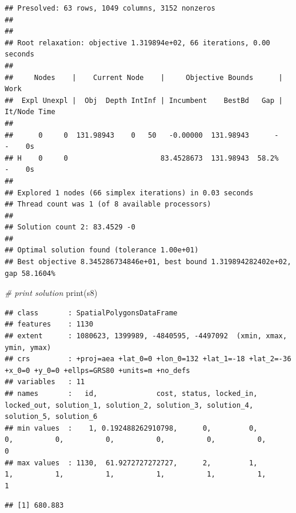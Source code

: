 \documentclass[
  12pt,
]{book}
\newenvironment{Shaded}{\begin{snugshade}}{\end{snugshade}}
\newcommand{\CommentTok}[1]{\textcolor[rgb]{0.56,0.35,0.01}{\textit{#1}}}
\newcommand{\FunctionTok}[1]{\textcolor[rgb]{0.00,0.00,0.00}{#1}}
\newcommand{\NormalTok}[1]{#1}
\newcommand{\SpecialCharTok}[1]{\textcolor[rgb]{0.00,0.00,0.00}{#1}}
\begin{document}
\begin{verbatim}
## Presolved: 63 rows, 1049 columns, 3152 nonzeros
## 
## 
## Root relaxation: objective 1.319894e+02, 66 iterations, 0.00 seconds
## 
##     Nodes    |    Current Node    |     Objective Bounds      |     Work
##  Expl Unexpl |  Obj  Depth IntInf | Incumbent    BestBd   Gap | It/Node Time
## 
##      0     0  131.98943    0   50   -0.00000  131.98943      -     -    0s
## H    0     0                      83.4528673  131.98943  58.2%     -    0s
## 
## Explored 1 nodes (66 simplex iterations) in 0.03 seconds
## Thread count was 1 (of 8 available processors)
## 
## Solution count 2: 83.4529 -0 
## 
## Optimal solution found (tolerance 1.00e+01)
## Best objective 8.345286734846e+01, best bound 1.319894282402e+02, gap 58.1604%
\end{verbatim}

\begin{Shaded}
\begin{Highlighting}[]
\CommentTok{\# print solution}
\FunctionTok{print}\NormalTok{(s8)}
\end{Highlighting}
\end{Shaded}

\begin{verbatim}
## class       : SpatialPolygonsDataFrame 
## features    : 1130 
## extent      : 1080623, 1399989, -4840595, -4497092  (xmin, xmax, ymin, ymax)
## crs         : +proj=aea +lat_0=0 +lon_0=132 +lat_1=-18 +lat_2=-36 +x_0=0 +y_0=0 +ellps=GRS80 +units=m +no_defs 
## variables   : 11
## names       :   id,              cost, status, locked_in, locked_out, solution_1, solution_2, solution_3, solution_4, solution_5, solution_6 
## min values  :    1, 0.192488262910798,      0,         0,          0,          0,          0,          0,          0,          0,          0 
## max values  : 1130,  61.9272727272727,      2,         1,          1,          1,          1,          1,          1,          1,          1
\end{verbatim}

\begin{Shaded}
\end{Shaded}

\begin{verbatim}
## [1] 680.883
\end{verbatim}
\end{document}
